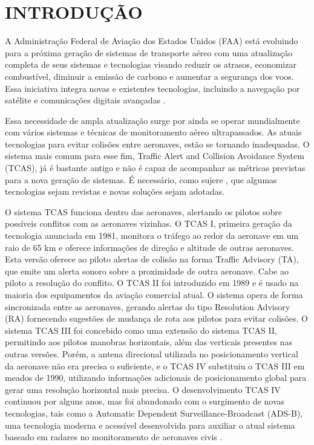 \section{INTRODUÇÃO}

A Administração Federal de Aviação dos Estados Unidos (FAA) está evoluindo para a próxima geração de sistemas de transporte aéreo com uma atualização completa de seus sistemas e tecnologias visando reduzir os atrasos, economizar combustível, diminuir a emissão de carbono e aumentar a segurança dos voos. Essa iniciativa integra novas e existentes tecnologias, incluindo a navegação por satélite e comunicações digitais avançadas \cite{faa2015}.

Essa necessidade de ampla atualização surge por ainda se operar mundialmente com vários sistemas e técnicas de monitoramento aéreo ultrapassados. As atuais tecnologias para evitar colisões entre aeronaves, estão se tornando inadequadas. O sistema mais comum para esse fim, Traffic Alert and Collision Avoidance System (TCAS), já é bastante antigo e não é capaz de acompanhar as métricas previstas para a nova geração de sistemas. É necessário, como sujere , que algumas tecnologias sejam revistas e novas soluções sejam adotadas.

O sistema TCAS funciona dentro das aeronaves, alertando os pilotos sobre possíveis conflitos com as aeronaves vizinhas. O TCAS I, primeira geração da tecnologia anunciada em 1981, monitora o tráfego ao redor da aeronave em um raio de 65 km e oferece informações de direção e altitude de outras aeronaves. Esta versão oferece ao piloto alertas de colisão na forma Traffic Advisory (TA), que emite um alerta sonoro sobre a proximidade de outra aeronave. Cabe ao piloto a resolução do conflito. O TCAS II foi introduzido em 1989 e é usado na maioria dos equipamentos da aviação comercial atual. O sistema opera de forma sincronizada entre as aeronaves, gerando alertas do tipo Resolution Advisory (RA) fornecendo sugestões de mudança de rota aos pilotos para evitar colisões. O sistema TCAS III foi concebido como uma extensão do sistema TCAS II, permitindo aos pilotos manobras horizontais, além das verticais presentes nas outras versões. Porém, a antena direcional utilizada no posicionamento vertical da aeronave não era precisa o suficiente, e o TCAS IV substituiu o TCAS III em meados de 1990, utilizando informações adicionais de posicionamento global para gerar uma resolução horizontal mais precisa. O desenvolvimento TCAS IV continuou por alguns anos, mas foi abandonado com o surgimento de novas tecnologias, tais como a Automatic Dependent Surveillance-Broadcast (ADS-B), uma tecnologia moderna e acessível desenvolvida para auxiliar o atual sistema baseado em radares no monitoramento de aeronaves civis \cite{Williamson1989}.

